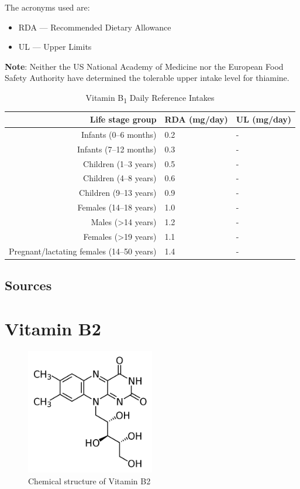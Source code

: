 \documentclass{book}
\begin{document}
The acronyms used are:
\begin{itemize}
	\item RDA --- Recommended Dietary Allowance
	\item UL --- Upper Limits
\end{itemize}

\textbf{Note}: Neither the US National Academy of Medicine nor the European Food Safety Authority have determined the tolerable upper intake level for thiamine.

\begin{table}[h]
	\caption{Vitamin B\textsubscript{1} Daily Reference Intakes}
	\centering \begin{tabular}{| r | l | l |}
		\hline
		\textbf{Life stage group} & \textbf{RDA (mg/day)} & \textbf{UL (mg/day)}\\ \hline
		Infants (0--6 months) & 0.2 & -\\ \hline
		Infants (7--12 months) & 0.3 & -\\ \hline
		Children (1--3 years) & 0.5 & -\\ \hline
		Children (4--8 years) & 0.6 & -\\ \hline
		Children (9--13 years) & 0.9 & -\\ \hline
		Females (14--18 years) & 1.0 & -\\ \hline
		Males (\textgreater14 years) & 1.2 & -\\ \hline
		Females (\textgreater19 years) & 1.1 & -\\ \hline
		Pregnant/lactating females (14--50 years) & 1.4 & -\\ \hline
	\end{tabular}
\end{table}
\newpage

\section{Sources}


\chapter{Vitamin B2}
\begin{figure}[h]
	\caption{Chemical structure of Vitamin B2}
	\centering \includegraphics[width=0.5\textwidth]{images/Vitamin_B2_chemical_structure}
\end{figure}
\end{document}
